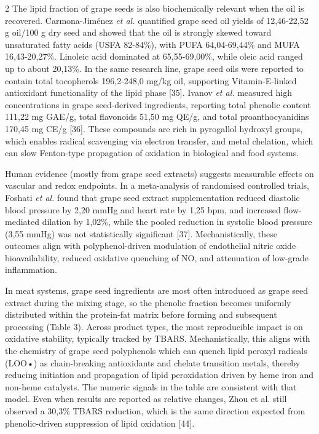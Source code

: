 \begin{multicols}{2}
The lipid fraction of grape seeds is also biochemically relevant when
the oil is recovered. Carmona-Jiménez \emph{et al.} quantified grape
seed oil yields of 12,46-22,52 g oil/100 g dry seed and showed that the
oil is strongly skewed toward unsaturated fatty acids (USFA 82-84\%),
with PUFA 64,04-69,44\% and MUFA 16,43-20,27\%. Linoleic acid dominated
at 65,55-69,00\%, while oleic acid ranged up to about 20,13\%. In the
same research line, grape seed oils were reported to contain total
tocopherols 196,2-248,0 mg/kg oil, supporting Vitamin-E-linked
antioxidant functionality of the lipid phase {[}35{]}. Ivanov \emph{et
al.} measured high concentrations in grape seed-derived ingredients,
reporting total phenolic content 111,22 mg GAE/g, total flavonoids 51,50
mg QE/g, and total proanthocyanidins 170,45 mg CE/g {[}36{]}. These
compounds are rich in pyrogallol hydroxyl groups, which enables radical
scavenging via electron transfer, and metal chelation, which can slow
Fenton-type propagation of oxidation in biological and food systems.

Human evidence (mostly from grape seed extracts) suggests measurable
effects on vascular and redox endpoints. In a meta-analysis of
randomised controlled trials, Foshati \emph{et al.} found that grape
seed extract supplementation reduced diastolic blood pressure by 2,20
mmHg and heart rate by 1,25 bpm, and increased flow-mediated dilation by
1,02\%, while the pooled reduction in systolic blood pressure (3,55
mmHg) was not statistically significant {[}37{]}. Mechanistically, these
outcomes align with polyphenol-driven modulation of endothelial nitric
oxide bioavailability, reduced oxidative quenching of NO, and
attenuation of low-grade inflammation.

In meat systems, grape seed ingredients are most often introduced as
grape seed extract during the mixing stage, so the phenolic fraction
becomes uniformly distributed within the protein-fat matrix before
forming and subsequent processing (Table 3). Across product types, the
most reproducible impact is on oxidative stability, typically tracked by
TBARS. Mechanistically, this aligns with the chemistry of grape seed
polyphenols which can quench lipid peroxyl radicals (LOO•) as
chain-breaking antioxidants and chelate transition metals, thereby
reducing initiation and propagation of lipid peroxidation driven by heme
iron and non-heme catalysts. The numeric signals in the table are
consistent with that model. Even when results are reported as relative
changes, Zhou et al. still observed a 30,3\% TBARS reduction, which is
the same direction expected from phenolic-driven suppression of lipid
oxidation {[}44{]}.


\end{multicols}
